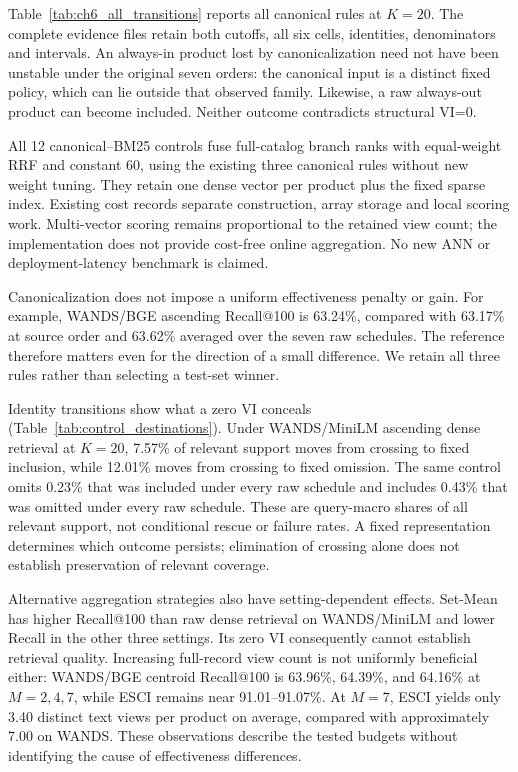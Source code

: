 Table~\ref{tab:ch6_all_transitions} reports all canonical rules at $K=20$. The complete evidence files retain both cutoffs, all six cells, identities, denominators and intervals. An always-in product lost by canonicalization need not have been unstable under the original seven orders: the canonical input is a distinct fixed policy, which can lie outside that observed family. Likewise, a raw always-out product can become included. Neither outcome contradicts structural VI=0.

All 12 canonical--BM25 controls fuse full-catalog branch ranks with equal-weight RRF and constant 60, using the existing three canonical rules without new weight tuning. They retain one dense vector per product plus the fixed sparse index. Existing cost records separate construction, array storage and local scoring work. Multi-vector scoring remains proportional to the retained view count; the implementation does not provide cost-free online aggregation. No new ANN or deployment-latency benchmark is claimed.

Canonicalization does not impose a uniform effectiveness penalty or gain. For example, WANDS/BGE ascending Recall@100 is 63.24\%, compared with 63.17\% at source order and 63.62\% averaged over the seven raw schedules. The reference therefore matters even for the direction of a small difference. We retain all three rules rather than selecting a test-set winner.

Identity transitions show what a zero VI conceals (Table~\ref{tab:control_destinations}). Under WANDS/MiniLM ascending dense retrieval at $K=20$, 7.57\% of relevant support moves from crossing to fixed inclusion, while 12.01\% moves from crossing to fixed omission. The same control omits 0.23\% that was included under every raw schedule and includes 0.43\% that was omitted under every raw schedule. These are query-macro shares of all relevant support, not conditional rescue or failure rates. A fixed representation determines which outcome persists; elimination of crossing alone does not establish preservation of relevant coverage.

Alternative aggregation strategies also have setting-dependent effects. Set-Mean has higher Recall@100 than raw dense retrieval on WANDS/MiniLM and lower Recall in the other three settings. Its zero VI consequently cannot establish retrieval quality. Increasing full-record view count is not uniformly beneficial either: WANDS/BGE centroid Recall@100 is 63.96\%, 64.39\%, and 64.16\% at $M=2,4,7$, while ESCI remains near 91.01--91.07\%. At $M=7$, ESCI yields only 3.40 distinct text views per product on average, compared with approximately 7.00 on WANDS. These observations describe the tested budgets without identifying the cause of effectiveness differences.

